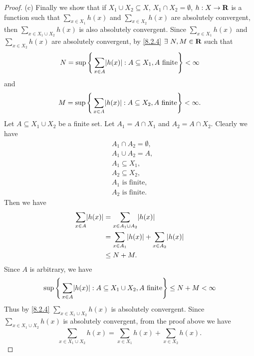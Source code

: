\begin{proof}{(c)}
  Finally we show that if \(X_1 \cup X_2 \subseteq X\), \(X_1 \cap X_2 = \emptyset\), \(h : X \to \mathbf{R}\) is a function such that \(\sum_{x \in X_1} h(x)\) and \(\sum_{x \in X_2} h(x)\) are absolutely convergent, then \(\sum_{x \in X_1 \cup X_2} h(x)\) is also absolutely convergent.
  Since \(\sum_{x \in X_1} h(x)\) and \(\sum_{x \in X_2} h(x)\) are absolutely convergent, by \cref{8.2.4} \(\exists\ N, M \in \R\) such that
  \[
    N = \sup\Bigg\{\sum_{x \in A} \abs{h(x)} : A \subseteq X_1, A \text{ finite}\Bigg\} < \infty
  \]
  and
  \[
    M = \sup\Bigg\{\sum_{x \in A} \abs{h(x)} : A \subseteq X_2, A \text{ finite}\Bigg\} < \infty.
  \]
  Let \(A \subseteq X_1 \cup X_2\) be a finite set.
  Let \(A_1 = A \cap X_1\) and \(A_2 = A \cap X_2\).
  Clearly we have
  \begin{align*}
     & A_1 \cap A_2 = \emptyset, \\
     & A_1 \cup A_2 = A,         \\
     & A_1 \subseteq X_1,        \\
     & A_2 \subseteq X_2,        \\
     & A_1 \text{ is finite},    \\
     & A_2 \text{ is finite}.
  \end{align*}
  Then we have
  \begin{align*}
    \sum_{x \in A} \abs{h(x)} & = \sum_{x \in A_1 \cup A_2} \abs{h(x)}                      \\
                              & = \sum_{x \in A_1} \abs{h(x)} + \sum_{x \in A_2} \abs{h(x)} \\
                              & \leq N + M.
  \end{align*}
  Since \(A\) is arbitrary, we have
  \[
    \sup\Bigg\{\sum_{x \in A} \abs{h(x)} : A \subseteq X_1 \cup X_2, A \text{ finite}\Bigg\} \leq N + M < \infty
  \]
  Thus by \cref{8.2.4} \(\sum_{x \in X_1 \cup X_2} h(x)\) is absolutely convergent.
  Since \(\sum_{x \in X_1 \cup X_2} h(x)\) is absolutely convergent, from the proof above we have
  \[
    \sum_{x \in X_1 \cup X_2} h(x) = \sum_{x \in X_1} h(x) + \sum_{x \in X_2} h(x).
  \]
\end{proof}

